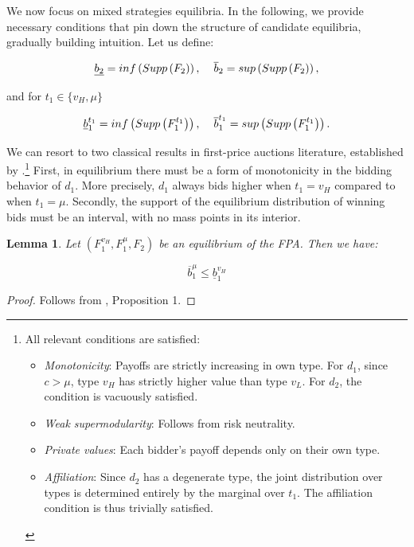 \documentclass[11pt]{article}
\theoremstyle{plain}
\theoremstyle{definition}
\theoremstyle{plain}
\theoremstyle{plain}
\theoremstyle{plain}
\newtheorem{lem}[thm]{Lemma}
\theoremstyle{plain}
\numberwithin{equation}{section}
\begin{document}
\vspace{4mm}

\noindent We now focus on mixed strategies equilibria. In the following, we provide necessary conditions that pin down the structure of candidate equilibria, gradually building intuition. Let us define:

\[
\underline{b_2} = inf\left(Supp\left(F_2\right)\right), \hspace{0.4cm} \overline b_2 = sup\left(Supp\left(F_2\right)\right),
\]

\vspace{0.2cm}

\noindent and for $ t_1 \in \{ v_H, \mu \} $

\[
\underline{b}_1^{t_1} = inf\left(Supp\left(F_1^{t_1}\right)\right), \hspace{0.4cm} \overline{b}_1^{t_1} = sup\left(Supp\left(F_1^{t_1}\right)\right).
\]

\vspace{0.4cm}

\noindent We can resort to two classical results in first-price auctions literature, established by \textcite{maskinEquilibriumSealedHigh2000}.\footnote{\noindent All relevant conditions are satisfied:
\begin{itemize}
    \item[-] \textit{Monotonicity}: Payoffs are strictly increasing in own type. For $ d_1 $, since $ c > \mu $, type $ v_H $ has strictly higher value than type $ v_L $. For $ d_2 $, the condition is vacuously satisfied.
    \item[-] \textit{Weak supermodularity}: Follows from risk neutrality.
    \item[-] \textit{Private values}: Each bidder's payoff depends only on their own type.
    \item[-] \textit{Affiliation}: Since $ d_2 $ has a degenerate type, the joint distribution over types is determined entirely by the marginal over $ t_1 $. The affiliation condition is thus trivially satisfied.
\end{itemize}
} First, in equilibrium there must be a form of monotonicity in the bidding behavior of $ d_1 $. More precisely, $ d_1 $ always bids higher when $ t_1 = v_H $ compared to when $ t_1 = \mu $. Secondly, the support of the equilibrium distribution of winning bids must be an interval, with no mass points in its interior.

\vspace{0.2cm}

\begin{lem}\label{lem:monotonicity}
Let $ \left(F_1^{v_H}, F_1^{\mu}, F_2 \right) $ be an equilibrium of the FPA. Then we have:

\begin{equation*}
\overline{b}_1^{\mu} \leq \underline{b}_1^{v_H}
\end{equation*}
\end{lem}
\begin{proof}
    Follows from \textcite{maskinEquilibriumSealedHigh2000}, Proposition 1.
\end{proof}
\end{document}
